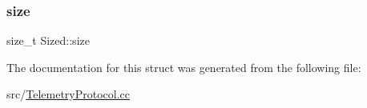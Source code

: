 \mbox{\label{struct_sized_a12b4432b66bb13986309dd678d3ad4b7}} 
\subsubsection{\texorpdfstring{size}{size}}
{\footnotesize\ttfamily size\+\_\+t Sized\+::size}



The documentation for this struct was generated from the following file\+:\begin{DoxyCompactItemize}
\item 
src/\mbox{\hyperlink{_telemetry_protocol_8cc}{Telemetry\+Protocol.\+cc}}\end{DoxyCompactItemize}
